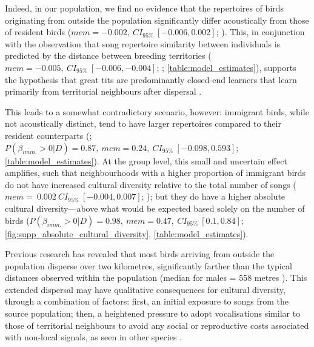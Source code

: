 \documentclass[9pt, onecolumn, twoside, lineno]{gsajnl}
\begin{document}
Indeed, in our population, we find no evidence that the repertoires of birds originating from outside the population significantly differ acoustically from those of resident birds ($mem = -0.002,~CI_{95\%}~[-0.006, 0.002]$; ). This, in conjunction with the observation that song repertoire similarity between individuals is predicted by the distance between breeding territories ($mem = -0.005,~CI_{95\%}~[-0.006, -0.004]$; ; \autoref{table:model_estimates}), supports the hypothesis that great tits are predominantly closed-end learners that learn primarily from territorial neighbours after dispersal \autocite{mcgregor1982b, rivera-gutierrez2011}.

This leads to a somewhat contradictory scenario, however: immigrant birds, while not acoustically distinct, tend to have larger repertoires compared to their resident counterparts (; $P(\beta_{\overline{imm}.} > 0 | D) = 0.87,~mem=0.24,~CI_{95\%}~[-0.098, 0.593]$; \autoref{table:model_estimates}). At the group level, this small and uncertain effect amplifies, such that neighbourhoods with a higher proportion of immigrant birds do not have increased cultural diversity relative to the total number of songs ($mem=~0.002~CI_{95\%}~[-0.004, 0.007]$; ); but they do have a higher absolute cultural diversity---above what would be expected based solely on the number of birds ($P(\beta_{\overline{imm}.} > 0 | D) = 0.98,~mem=0.47,~CI_{95\%}~[0.1, 0.84]$; \autoref{fig:supp_absolute_cultural_diversity}, \autoref{table:model_estimates}). 

Previous research \autocite{verhulst1997}  has revealed that most birds arriving from outside the population disperse over two kilometres, significantly farther than the typical distances observed within the population (median for males = 558 metres \autocite{greenwood1979}). This extended dispersal may have qualitative consequences for cultural diversity, through a combination of factors: first, an initial exposure to songs from the source population; then, a heightened pressure to adopt vocalisations similar to those of territorial neighbours to avoid any social or reproductive costs associated with non-local signals, as seen in other species \autocite{payne1983, baker1981, mortega2014, lachlan2014, beecher2008}.
\end{document}
